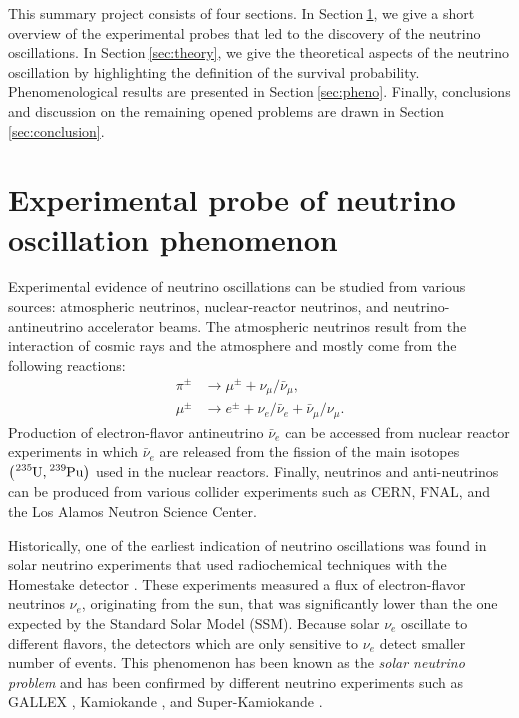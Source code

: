 \documentclass[twocolumn,secnumarabic,amssymb, nobibnotes, aps, prd,10pt]{revtex4-1}
\newcommand{\Sec}[1]{Section$\:$\ref{#1}}
\begin{document}
This summary project consists of four sections. In \Sec{sec:experiment}, we give a short
overview of the experimental probes that led to the discovery of the neutrino oscillations.
In \Sec{sec:theory}, we give the theoretical aspects of the neutrino oscillation by
highlighting the definition of the survival probability. Phenomenological results are presented
in \Sec{sec:pheno}. Finally, conclusions and discussion on the remaining opened problems are
drawn in \Sec{sec:conclusion}.


\section{Experimental probe of neutrino oscillation phenomenon}
\label{sec:experiment}

Experimental evidence of neutrino oscillations can be studied from various sources:
atmospheric neutrinos, nuclear-reactor neutrinos, and neutrino-antineutrino accelerator
beams. The atmospheric neutrinos result from the interaction of cosmic rays and the
atmosphere and mostly come from the following reactions:
\begin{align}
\pi^\pm  &\longrightarrow \mu^\pm + \nu_\mu / \bar{\nu}_\mu, \\
\mu^\pm  &\longrightarrow e^\pm + \nu_e / \bar{\nu}_e + \bar{\nu}_\mu / \nu_\mu .
\end{align}
Production of electron-flavor antineutrino $\bar{\nu}_e$ can be accessed from nuclear
reactor experiments in which $\bar{\nu}_e$ are released from the fission of the 
main isotopes $\left( \ce{^{235}U}, \ce{^{239}Pu} \right)$ used in the nuclear reactors.
Finally, neutrinos and anti-neutrinos can be produced from various collider experiments such as
CERN, FNAL, and the Los Alamos Neutron Science Center.

Historically, one of the earliest indication of neutrino oscillations was found in 
solar neutrino experiments that used radiochemical techniques with the Homestake
detector \cite{Cleveland:1998nv}. These experiments measured a flux of electron-flavor 
neutrinos $\nu_e$, originating from the sun, that was significantly lower than the 
one expected by the Standard Solar Model (SSM). Because solar $\nu_e$ oscillate to 
different flavors, the detectors which are only sensitive to $\nu_e$ detect smaller 
number of events. This phenomenon has been known as the \emph{solar neutrino problem} 
and has been confirmed by different neutrino experiments such as GALLEX 
\cite{Hampel:1996qd, Anselmann:1993mh}, Kamiokande \cite{Hirata:1988ad, Hirata:1991ub, 
Fukuda:1996sz}, and Super-Kamiokande \cite{Fukuda:1998fd, Giunti:1999qm}.
\end{document}
